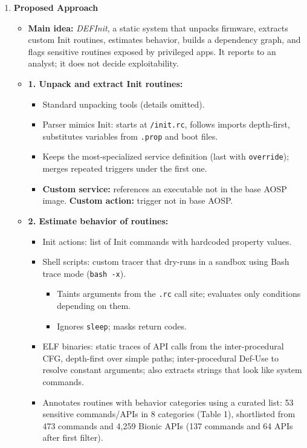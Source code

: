 \documentclass[11pt,a4paper]{article}
\newcommand{\entrypart}[1]{\textbf{\color{accent}#1}\par\vspace{2pt}}
\begin{document}
\begin{enumerate}
    \item \entrypart{Proposed Approach}
    \begin{itemize}[leftmargin=*, itemsep=1pt, topsep=2pt]
        \item \textbf{Main idea:} \emph{DEFInit}, a static system that unpacks firmware, extracts custom Init routines, estimates behavior, builds a dependency graph, and flags sensitive routines exposed by privileged apps. It reports to an analyst; it does not decide exploitability.
        \item \textbf{1. Unpack and extract Init routines:}
        \begin{itemize}[itemsep=0pt]
            \item Standard unpacking tools (details omitted).
            \item Parser mimics Init: starts at \texttt{/init.rc}, follows imports depth-first, substitutes variables from \texttt{.prop} and boot files.
            \item Keeps the most-specialized service definition (last with \texttt{override}); merges repeated triggers under the first one.
            \item \textbf{Custom service:} references an executable not in the base AOSP image. \textbf{Custom action:} trigger not in base AOSP.
        \end{itemize}
        \item \textbf{2. Estimate behavior of routines:}
        \begin{itemize}[itemsep=0pt]
            \item Init actions: list of Init commands with hardcoded property values.
            \item Shell scripts: custom tracer that dry-runs in a sandbox using Bash trace mode (\texttt{bash -x}).
            \begin{itemize}[itemsep=0pt]
                \item Taints arguments from the \texttt{.rc} call site; evaluates only conditions depending on them.
                \item Ignores \texttt{sleep}; masks return codes.
            \end{itemize}
            \item ELF binaries: static traces of API calls from the inter-procedural CFG, depth-first over simple paths; inter-procedural Def-Use to resolve constant arguments; also extracts strings that look like system commands.
            \item Annotates routines with behavior categories using a curated list: 53 sensitive commands/APIs in 8 categories (Table 1), shortlisted from 473 commands and 4,259 Bionic APIs (137 commands and 64 APIs after first filter).

\end{itemize}
\end{itemize}
\end{enumerate}
\end{document}
